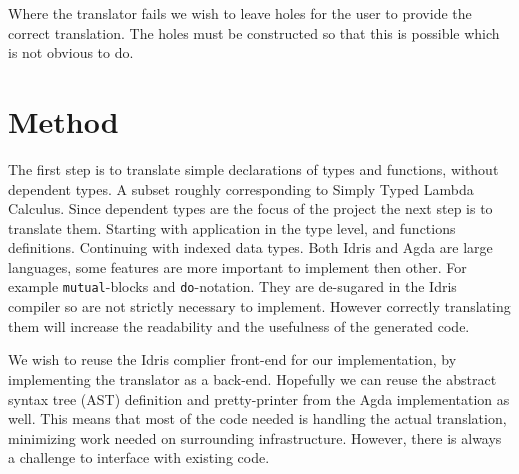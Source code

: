 \documentclass[parskip=half]{scrartcl}
\begin{document}
Where the translator fails we wish to leave holes for the user to provide the
correct translation. The holes must be constructed so that this is possible
which is not obvious to do.


\section{Method}
The first step is to translate simple declarations of types and functions,
without dependent types. A subset roughly corresponding to Simply Typed Lambda
Calculus. Since dependent types are the focus of the project the next step is
to translate them. Starting with application in the type level, and functions
definitions. Continuing with indexed data types.
Both Idris and Agda are large languages, some features are more important to
implement then other.  For example \texttt{mutual}-blocks and
\texttt{do}-notation. They are de-sugared in the Idris compiler so are not
strictly necessary to implement. However correctly translating them will
increase the readability and the usefulness of the generated code.





We wish to reuse the Idris complier front-end for our implementation, by
implementing the translator as a back-end. Hopefully we can reuse the abstract
syntax tree (AST) definition and pretty-printer from the Agda implementation as
well. This means that most of the code needed is handling the actual
translation, minimizing work needed on surrounding infrastructure.  However,
there is always a challenge to interface with existing code.

\end{document}
